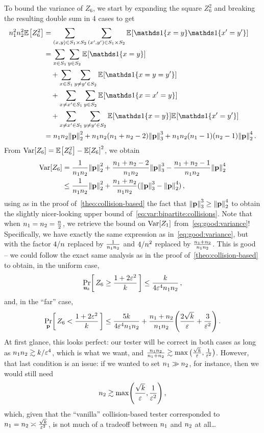 To bound the variance of $Z_6$, we start by expanding the square $Z_6^2$ and breaking the resulting double sum in 4 cases to get
\begin{align*}
  \nss^2 \nst^2 \bEE{Z_6^2}
  &= \sum_{(x,y)\in S_1\times S_2}\sum_{(x',y')\in S_1\times S_2} \bEE{\indic{x=y}\indic{x'=y'}} \\
  &= \sum_{x\in S_1}\sum_{y\in S_2}\bEE{\indic{x=y}}\\
  &\quad+ \sum_{x\in S_1}\sum_{y\neq y'\in S_2}\bEE{\indic{x=y=y'}} \\
  &\quad+ \sum_{x\neq x'\in S_1}\sum_{y\in S_2}\bEE{\indic{x=x'=y}} \\
  &\quad+\sum_{x\neq x'\in S_1}\sum_{y \neq y'\in S_2} \bEE{\indic{x=y}}\bEE{\indic{x'=y'}}  \\
  &= \nss\nst \normtwo{\p}^2 + \nss \nst(\nss+\nst-2) \norm{\p}_3^3 + \nss\nst(\nss-1)(\nst-1) \normtwo{\p}^4\,.
\end{align*}
From $\Var[Z_6] = \bEE{Z_6^2} - \expect{Z_6}^2$, we obtain
\begin{align}
  \Var[Z_6] 
  &= \frac{1}{\nss\nst}\normtwo{\p}^2 + \frac{\nss+\nst-2}{\nss\nst}\norm{\p}_3^3 - \frac{\nss+\nst-1}{\nss\nst}\normtwo{\p}^4 \notag\\
  &\leq \frac{1}{\nss\nst}\normtwo{\p}^2 + \frac{\nss+\nst}{\nss\nst}(\norm{\p}_3^3-\normtwo{\p}^4) \label{eq:var:bipartite:collisions}\,,
\end{align}
using as in the proof of~\cref{theo:collision-based} the fact that $\norm{\p}_3^3 \geq \normtwo{\p}^4$ to obtain the slightly nicer-looking upper bound of~\cref{eq:var:bipartite:collisions}. Note that when $n_1=n_2=\frac{n}{2}$, we retrieve the bound on $\operatorname{Var}[Z_1]$ from~\cref{eq:good:variance}! Specifically, we have exactly the same expression as in~\cref{eq:good:variance}, but with the factor $4/n$ replaced by $\frac{1}{n_1n_2}$ and $4/n^2$ replaced by $\frac{n_1+n_2}{n_1n_2}$. This is good -- we could follow the exact same analysis as in the proof of~\cref{theo:collision-based} to obtain, in the uniform case,
\[
  \probaDistrOf{\uniform_\ab}{ Z_6 \geq \frac{1+2\dst^2}{\ab} }
  \leq \frac{\ab}{4\dst^4\nss\nst}\,, 
\]
and, in the ``far'' case,
\begin{align}
  \label{eq:uniform:bipartite:firstattempt}
  \probaDistrOf{\p}{ Z_6 < \frac{1+2\dst^2}{\ab} }
  \leq \frac{5\ab}{4\dst^4\nss\nst} + \frac{\nss+\nst}{\nss\nst}\Paren{\frac{2\sqrt{\ab}}{\dst}+\frac{3}{\dst^2}}\,.
\end{align}
At first glance, this looks perfect: our tester will be correct in both cases as long as $n_1n_2 \gtrsim k/\varepsilon^4$, which is what we want, and $\frac{n_1n_2}{n_1+n_2} \gtrsim \max\big(\frac{\sqrt{k}}{\varepsilon}, \frac{1}{\varepsilon^2}\big)$. However, that last condition is an issue: if we wanted to set $n_1\gg n_2$, for instance, then we would still need
\[
    \nst \gtrsim \max\Paren{\frac{\sqrt{\ab}}{\dst}, \frac{1}{\dst^2} }\,,
\]
which, given that the ``vanilla'' collision-based tester corresponded to $n_1=n_2 \asymp \frac{\sqrt{k}}{\varepsilon^2}$, is not much of a tradeoff between $n_1$ and $n_2$ at all\dots

